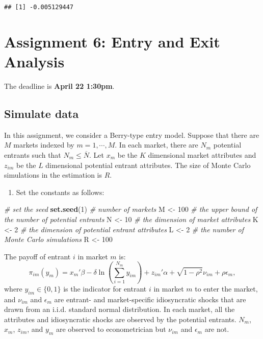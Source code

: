 \documentclass[
]{book}
\newenvironment{Shaded}{\begin{snugshade}}{\end{snugshade}}
\newcommand{\CommentTok}[1]{\textcolor[rgb]{0.56,0.35,0.01}{\textit{#1}}}
\newcommand{\DecValTok}[1]{\textcolor[rgb]{0.00,0.00,0.81}{#1}}
\newcommand{\KeywordTok}[1]{\textcolor[rgb]{0.13,0.29,0.53}{\textbf{#1}}}
\newcommand{\NormalTok}[1]{#1}
\newcommand{\StringTok}[1]{\textcolor[rgb]{0.31,0.60,0.02}{#1}}
\providecommand{\tightlist}{%
  \setlength{\itemsep}{0pt}\setlength{\parskip}{0pt}}
\begin{document}
\begin{verbatim}
## [1] -0.005129447
\end{verbatim}

\hypertarget{assignment6}{%
\chapter{Assignment 6: Entry and Exit Analysis}\label{assignment6}}

The deadline is \textbf{April 22 1:30pm}.

\hypertarget{simulate-data}{%
\section{Simulate data}\label{simulate-data}}

In this assignment, we consider a Berry-type entry model. Suppose that there are \(M\) markets indexed by \(m = 1, \cdots, M\). In each market, there are \(N_m\) potential entrants such that \(N_m \le \overline{N}\). Let \(x_m\) be the \(K\) dimensional market attributes and \(z_{im}\) be the \(L\) dimensional potential entrant attributes. The size of Monte Carlo simulations in the estimation is \(R\).

\begin{enumerate}
\def\labelenumi{\arabic{enumi}.}
\tightlist
\item
  Set the constants as follows:
\end{enumerate}

\begin{Shaded}
\begin{Highlighting}[]
\CommentTok{# set the seed}
\KeywordTok{set.seed}\NormalTok{(}\DecValTok{1}\NormalTok{)}
\CommentTok{# number of markets}
\NormalTok{M <-}\StringTok{ }\DecValTok{100}
\CommentTok{# the upper bound of the number of potential entrants}
\NormalTok{N <-}\StringTok{ }\DecValTok{10}
\CommentTok{# the dimension of market attributes}
\NormalTok{K <-}\StringTok{ }\DecValTok{2}
\CommentTok{# the dimension of potential entrant attributes}
\NormalTok{L <-}\StringTok{ }\DecValTok{2}
\CommentTok{# the number of Monte Carlo simulations}
\NormalTok{R <-}\StringTok{ }\DecValTok{100}
\end{Highlighting}
\end{Shaded}

The payoff of entrant \(i\) in market \(m\) is:
\[
\pi_{im}(y_m) = x_m'\beta - \delta \ln \left(\sum_{i = 1}^{N_m} y_{im}\right) + z_{im}'\alpha + \sqrt{1 - \rho^2} \nu_{im} + \rho \epsilon_{m},
\]
where \(y_{im} \in \{0, 1\}\) is the indicator for entrant \(i\) in market \(m\) to enter the market, and \(\nu_{im}\) and \(\epsilon_m\) are entrant- and market-specific idiosyncratic shocks that are drawn from an i.i.d. standard normal distribution. In each market, all the attributes and idiosyncratic shocks are observed by the potential entrants. \(N_m\), \(x_m\), \(z_{im}\), and \(y_m\) are observed to econometrician but \(\nu_{im}\) and \(\epsilon_m\) are not.
\end{document}

